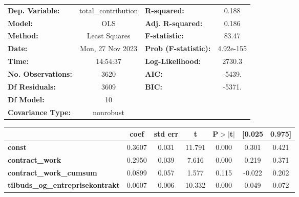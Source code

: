\begin{center}
\begin{tabular}{lclc}
\toprule
\textbf{Dep. Variable:}                  & total\_contribution & \textbf{  R-squared:         } &     0.188   \\
\textbf{Model:}                          &         OLS         & \textbf{  Adj. R-squared:    } &     0.186   \\
\textbf{Method:}                         &    Least Squares    & \textbf{  F-statistic:       } &     83.47   \\
\textbf{Date:}                           &   Mon, 27 Nov 2023  & \textbf{  Prob (F-statistic):} & 4.92e-155   \\
\textbf{Time:}                           &       14:54:37      & \textbf{  Log-Likelihood:    } &    2730.3   \\
\textbf{No. Observations:}               &          3620       & \textbf{  AIC:               } &    -5439.   \\
\textbf{Df Residuals:}                   &          3609       & \textbf{  BIC:               } &    -5371.   \\
\textbf{Df Model:}                       &            10       & \textbf{                     } &             \\
\textbf{Covariance Type:}                &      nonrobust      & \textbf{                     } &             \\
\bottomrule
\end{tabular}
\begin{tabular}{lcccccc}
                                         & \textbf{coef} & \textbf{std err} & \textbf{t} & \textbf{P$> |$t$|$} & \textbf{[0.025} & \textbf{0.975]}  \\
\midrule
\textbf{const}                           &       0.3607  &        0.031     &    11.791  &         0.000        &        0.301    &        0.421     \\
\textbf{contract\_work}                  &       0.2950  &        0.039     &     7.616  &         0.000        &        0.219    &        0.371     \\
\textbf{contract\_work\_cumsum}          &       0.0899  &        0.057     &     1.577  &         0.115        &       -0.022    &        0.202     \\
\textbf{tilbuds\_og\_entreprisekontrakt} &       0.0607  &        0.006     &    10.332  &         0.000        &        0.049    &        0.072     \\

\end{tabular}
\end{center}
